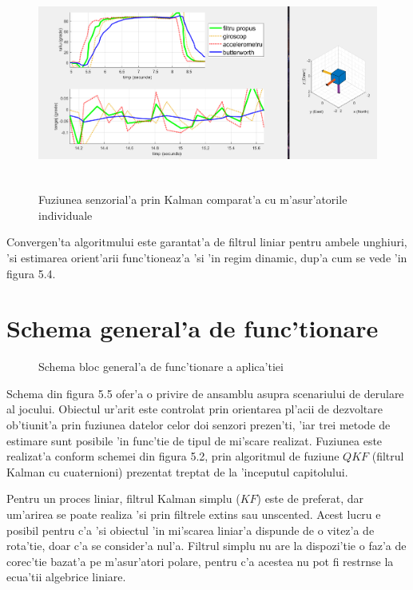 \documentclass[12pt,a4paper,twoside]{report}
\begin{document}
\begin{figure}[h]
\centering
 \includegraphics[width=150mm,height=70mm,]{img/Roll}
 \caption{Fuziunea senzorial'a prin Kalman comparat'a cu m'asur'atorile individuale}
\end{figure}

Convergen'ta algoritmului este garantat'a de filtrul liniar pentru ambele unghiuri, 'si estimarea orient'arii func'tioneaz'a 'si 'in regim dinamic, dup'a cum se vede 'in figura 5.4.

\section{Schema general'a de func'tionare}

\begin{figure}[H]
\hspace*{-2.5cm}
 
 \caption{Schema bloc general'a de func'tionare a aplica'tiei}
\end{figure}


Schema din figura 5.5 ofer'a o privire de ansamblu asupra scenariului de derulare al jocului. Obiectul ur'arit este controlat prin orientarea pl'acii de dezvoltare ob'tiunit'a prin fuziunea datelor celor doi senzori prezen'ti, 'iar trei metode de estimare sunt posibile 'in func'tie de tipul de mi'scare realizat. Fuziunea este realizat'a conform schemei din figura 5.2, prin algoritmul de fuziune $QKF$ (filtrul Kalman cu cuaternioni) prezentat treptat de la 'inceputul capitolului.

\vspace{5px}

Pentru un proces liniar, filtrul Kalman simplu ($KF$) este de preferat, dar um'arirea se poate realiza 'si prin filtrele extins sau unscented. Acest lucru e posibil pentru c'a 'si obiectul 'in mi'scarea liniar'a dispunde de o vitez'a de rota'tie, doar c'a se consider'a nul'a. Filtrul simplu nu are la dispozi'tie o faz'a de corec'tie bazat'a pe m'asur'atori polare, pentru c'a acestea nu pot fi restr\ia nse la ecua'tii algebrice liniare.  
\end{document}
